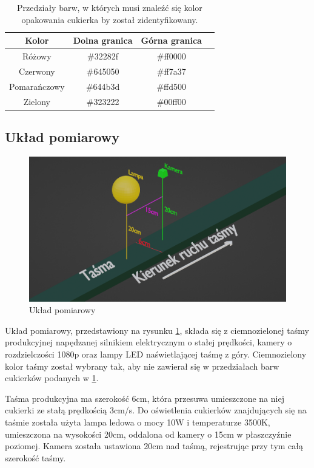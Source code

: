 \documentclass{article}
\begin{document}
\begin{table}[H]
    \label{tab:tab1}
    \centering
    \begin{tabular}{ |c|c|c|c| }
     \hline
     Kolor & Dolna granica & Górna granica \\
     \hline
     Różowy & \#32282f & \#ff0000 \\
     \hline
     Czerwony & \#645050 & \#ff7a37 \\
     \hline
     Pomarańczowy & \#644b3d & \#ffd500 \\
     \hline
     Zielony & \#323222 & \#00ff00 \\
     \hline
    \end{tabular}
    \caption{Przedziały barw, w których musi znaleźć się kolor opakowania cukierka by został zidentyfikowany.}
\end{table}

\subsection{Układ pomiarowy}
\label{Układ pomiarowy}

\begin{figure}[H]
    \centering
    \includegraphics[width=\linewidth]{ukladPomiarowy.png}
    \caption{Układ pomiarowy}
    \label{fig:ukladPomiarowy}
\end{figure}

Układ pomiarowy, przedstawiony na rysunku \ref{fig:ukladPomiarowy}, składa się z ciemnozielonej taśmy produkcyjnej napędzanej silnikiem elektrycznym o stałej prędkości, kamery o rozdzielczości 1080p oraz lampy LED naświetlającej taśmę z góry. Ciemnozielony kolor taśmy został wybrany tak, aby nie zawierał się w przedziałach barw cukierków podanych w \ref{tab:tab1}.

Taśma produkcyjna ma szerokość 6cm, która przesuwa umieszczone na niej cukierki ze stałą prędkością 3cm/s. Do oświetlenia cukierków znajdujących się na taśmie została użyta lampa ledowa o mocy 10W i temperaturze 3500K, umieszczona na wysokości 20cm, oddalona od kamery o 15cm w płaszczyźnie poziomej. Kamera została ustawiona 20cm nad taśmą, rejestrując przy tym całą szerokość taśmy.
\end{document}
